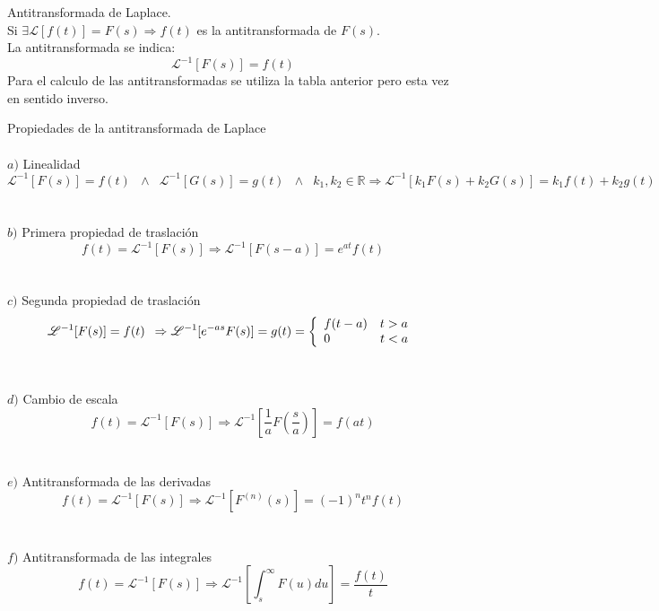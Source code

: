 \documentclass[]{article}
\begin{document}
\huge Antitransformada de Laplace.
\normalsize
\\

Si $\exists \mathscr{L}[f(t)] = F(s) \Rightarrow f(t)$ es la antitransformada de $F(s)$.
\\
La antitransformada se indica: $$\mathscr{L}^{-1}[F(s)] = f(t)$$
Para el calculo de las antitransformadas se utiliza la tabla anterior pero esta vez en sentido inverso.

\large Propiedades de la antitransformada de Laplace
\normalsize
\\
\\
$a)$ Linealidad
$$
\mathscr{L}^{-1}[F(s)] = f(t)\hspace{7pt} \wedge\hspace{7pt} \mathscr{L}^{-1}[G(s)] = g(t)\hspace{7pt} \wedge\hspace{7pt} k_{1} , k_{2} \in \mathbb{R} \Rightarrow \mathscr{L}^{-1}[k_{1}F(s) + k_{2}G(s)] = k_{1} f(t) + k_{2} g(t)
$$
\\
\\
$b)$ Primera propiedad de traslación
$$
f(t) = \mathscr{L}^{-1}[F(s)] \Rightarrow \mathscr{L}^{-1}[F(s-a)] = e^{at}f(t)
$$
\\
\\
$c)$ Segunda propiedad de traslación
$$ 
\mathscr{L}^{-1}[F(s)] = f(t) \hspace{5pt}
\Rightarrow \mathscr{L}^{-1}[e^{-as}F(s)] = g(t) = \left\{
	\begin{array}{ll}
		f(t-a) \hspace{10pt} t > a \\
		0 \hspace{40pt} t < a
	\end{array}
\right. \\ 
$$
\\
\\
$d)$ Cambio de escala
$$
f(t) = \mathscr{L}^{-1}[F(s)] \Rightarrow \mathscr{L}^{-1}[\frac{1}{a}F(\frac{s}{a})] = f(at) 	
$$
\\
\\
$e)$ Antitransformada de las derivadas
$$
f(t) = \mathscr{L}^{-1}[F(s)] \Rightarrow \mathscr{L}^{-1}[F^{(n)}(s)] = (-1)^{n}t^{n}f(t) 
$$
\\
\\
$f)$ Antitransformada de las integrales
$$
f(t) = \mathscr{L}^{-1}[F(s)] \Rightarrow \mathscr{L}^{-1}[\int_s^{\infty}F(u)du] =\frac{f(t)}{t}
$$
\\
\\
\end{document}
